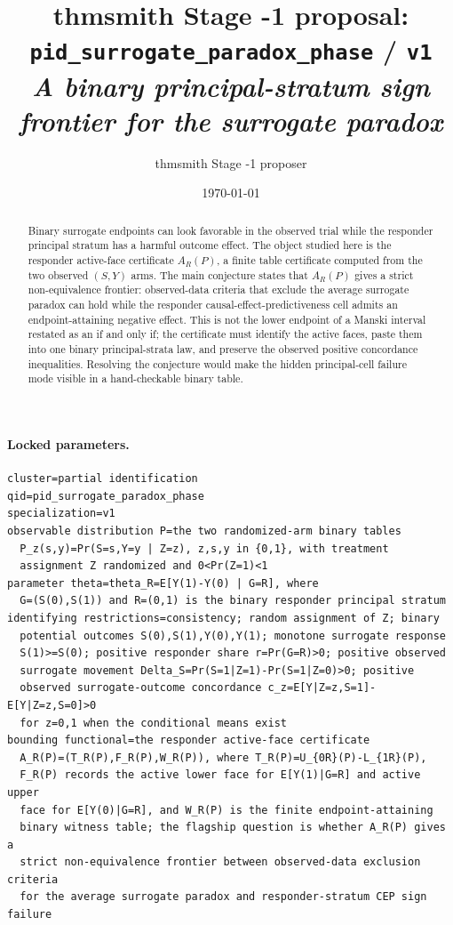 \documentclass[11pt]{article}
\title{thmsmith Stage -1 proposal: \texttt{pid\_surrogate\_paradox\_phase} / \texttt{v1}%
  \\ \large\textit{A binary principal-stratum sign frontier for the surrogate paradox}}
\author{thmsmith Stage -1 proposer}
\date{\today}
\theoremstyle{definition}
\theoremstyle{plain}
\theoremstyle{remark}
\begin{document}
\maketitle


\paragraph{Locked parameters.}
\begin{verbatim}
cluster=partial identification
qid=pid_surrogate_paradox_phase
specialization=v1
observable distribution P=the two randomized-arm binary tables
  P_z(s,y)=Pr(S=s,Y=y | Z=z), z,s,y in {0,1}, with treatment
  assignment Z randomized and 0<Pr(Z=1)<1
parameter theta=theta_R=E[Y(1)-Y(0) | G=R], where
  G=(S(0),S(1)) and R=(0,1) is the binary responder principal stratum
identifying restrictions=consistency; random assignment of Z; binary
  potential outcomes S(0),S(1),Y(0),Y(1); monotone surrogate response
  S(1)>=S(0); positive responder share r=Pr(G=R)>0; positive observed
  surrogate movement Delta_S=Pr(S=1|Z=1)-Pr(S=1|Z=0)>0; positive
  observed surrogate-outcome concordance c_z=E[Y|Z=z,S=1]-E[Y|Z=z,S=0]>0
  for z=0,1 when the conditional means exist
bounding functional=the responder active-face certificate
  A_R(P)=(T_R(P),F_R(P),W_R(P)), where T_R(P)=U_{0R}(P)-L_{1R}(P),
  F_R(P) records the active lower face for E[Y(1)|G=R] and active upper
  face for E[Y(0)|G=R], and W_R(P) is the finite endpoint-attaining
  binary witness table; the flagship question is whether A_R(P) gives a
  strict non-equivalence frontier between observed-data exclusion criteria
  for the average surrogate paradox and responder-stratum CEP sign failure
\end{verbatim}

\begin{abstract}
Binary surrogate endpoints can look favorable in the observed trial while the responder principal stratum has a harmful outcome effect. The object studied here is the responder active-face certificate \(A_R(P)\), a finite table certificate computed from the two observed \((S,Y)\) arms. The main conjecture states that \(A_R(P)\) gives a strict non-equivalence frontier: observed-data criteria that exclude the average surrogate paradox can hold while the responder causal-effect-predictiveness cell admits an endpoint-attaining negative effect. This is not the lower endpoint of a Manski interval restated as an if and only if; the certificate must identify the active faces, paste them into one binary principal-strata law, and preserve the observed positive concordance inequalities. Resolving the conjecture would make the hidden principal-cell failure mode visible in a hand-checkable binary table.
\end{abstract}
\end{document}
